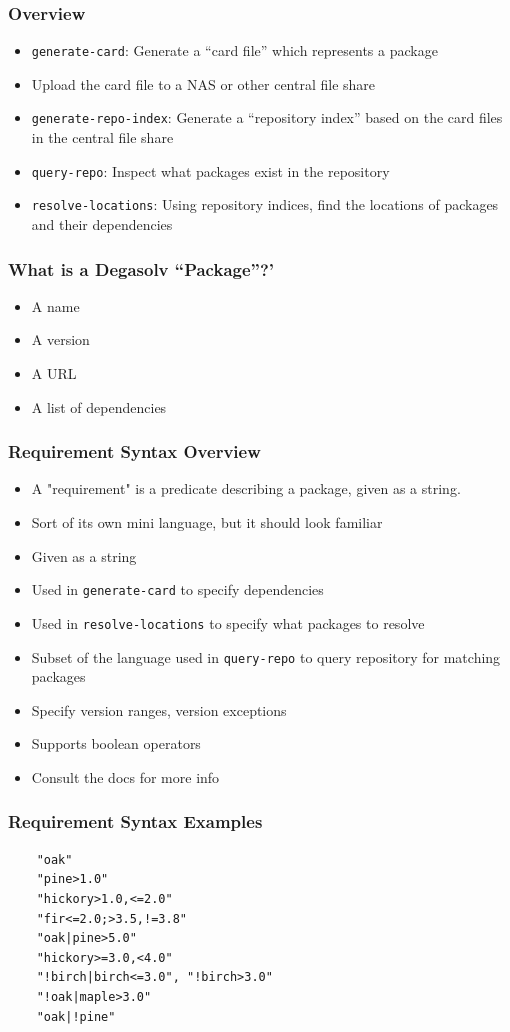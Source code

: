 \documentclass{beamer}
\begin{document}
\begin{frame}
  \frametitle{Overview}
  \begin{itemize}
  \item \texttt{generate-card}: Generate a ``card file'' which represents a package
  \item Upload the card file to a NAS or other central file share
  \item \texttt{generate-repo-index}: Generate a ``repository index''
    based on the card files in the central file share
  \item \texttt{query-repo}: Inspect what packages exist in the repository
  \item \texttt{resolve-locations}: Using repository indices, find the locations
    of packages and their dependencies
  \end{itemize}
\end{frame}
\begin{frame}
  \frametitle{What is a Degasolv ``Package''?'}
  \begin{itemize}
  \item A name
  \item A version
  \item A URL
  \item A list of dependencies
  \end{itemize}
\end{frame}
\begin{frame}
  \frametitle{Requirement Syntax Overview}
  \begin{itemize}
  \item A "requirement" is a predicate describing a package, given as a string.
  \item Sort of its own mini language, but it should look familiar
  \item Given as a string
  \item Used in \texttt{generate-card} to specify dependencies
  \item Used in \texttt{resolve-locations} to specify what packages to resolve
  \item Subset of the language used in \texttt{query-repo} to query repository for
    matching packages
  \item Specify version ranges, version exceptions
  \item Supports boolean operators
  \item Consult the docs for more info
  \end{itemize}
\end{frame}
\begin{frame}[fragile]
  \frametitle{Requirement Syntax Examples}
\begin{verbatim}
    "oak"
    "pine>1.0"
    "hickory>1.0,<=2.0"
    "fir<=2.0;>3.5,!=3.8"
    "oak|pine>5.0"
    "hickory>=3.0,<4.0"
    "!birch|birch<=3.0", "!birch>3.0"
    "!oak|maple>3.0"
    "oak|!pine"
\end{verbatim}
\end{frame}
\end{document}
